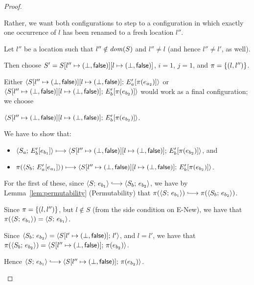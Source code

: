 \begin{proof}
\begin{enumerate}
\begin{enumerate}
\begin{itemize}
        Rather, we want both configurations to step to a configuration
        in which exactly one occurrence of $l$ has been renamed to a
        fresh location $l''$.

        Let $l''$ be a location such that $l'' \notin \mathit{dom}(S)$ and
        $l'' \neq l$ (and hence $l'' \neq l'$, as well).

        Then choose $S' =
        S[l'' \mapsto (\bot, \textsf{false})][l \mapsto (\bot, \textsf{false})]$,
        $i = 1$, $j = 1$, and $\pi = \left\{(l, l'')\right\}$.

        Either
        $\langle S[l'' \mapsto (\bot, \textsf{false})][l \mapsto (\bot, \textsf{false})];\, E'_a\hspace{-0.5mm}\left[\pi(e_{a_2})\right] \rangle$
        or
        $\langle S[l'' \mapsto (\bot, \textsf{false})][l \mapsto (\bot, \textsf{false})];\, E'_b\hspace{-0.5mm}\left[\pi(e_{b_2})\right] \rangle$
        would work as a final configuration; we choose

        $\langle S[l'' \mapsto (\bot, \textsf{false})][l \mapsto (\bot, \textsf{false})];\, E'_b\hspace{-0.5mm}\left[\pi(e_{b_2})\right] \rangle$.

        We have to show that:
        \begin{itemize}
        \item $\langle S_a;\, E'_b\hspace{-0.5mm}\left[e_{b_1}\right] \rangle \longmapsto
          \langle S[l'' \mapsto (\bot, \textsf{false})][l \mapsto (\bot, \textsf{false})];\, E'_b\hspace{-0.5mm}\left[\pi(e_{b_2})\right] \rangle$,
          and
        \item $\pi(\langle S_b;\, E'_a\hspace{-0.5mm}\left[e_{a_1}\right] \rangle)
          \longmapsto
          \langle S[l'' \mapsto (\bot, \textsf{false})][l \mapsto (\bot, \textsf{false})];\, E'_b\hspace{-0.5mm}\left[\pi(e_{b_2})\right] \rangle$.
        \end{itemize}

        For the first of these, since $\config{S}{e_{b_1}}
        \parstepsto \config{S_b}{e_{b_2}}$, we have by
        Lemma~\ref{lem:permutability} (Permutability) that
        $\pi(\config{S}{e_{b_1}}) \parstepsto
        \pi(\config{S_b}{e_{b_2}})$.

        Since $\pi = \left\{(l, l'')\right\}$, but $l \notin S$ (from the
        side condition on {\sc E-New}), we have that
        $\pi(\langle S;\, e_{b_1} \rangle) = \langle S;\, e_{b_1} \rangle$.

        Since $\langle S_b;\, e_{b_2} \rangle =
        \langle S[l' \mapsto (\bot, \textsf{false})];\, l' \rangle$, and $l = l'$,
        we have that $\pi(\langle S_b;\, e_{b_2} \rangle) =
        \langle S[l'' \mapsto (\bot, \textsf{false})];\, \pi(e_{b_2}) \rangle$.

        Hence $\config{S}{e_{b_1}} \parstepsto
        \config{\extS{S}{l''}{\bot}{\frozenfalse}}{\pi(e_{b_2})}$.


\end{itemize}
\end{enumerate}
\end{enumerate}
\end{proof}
